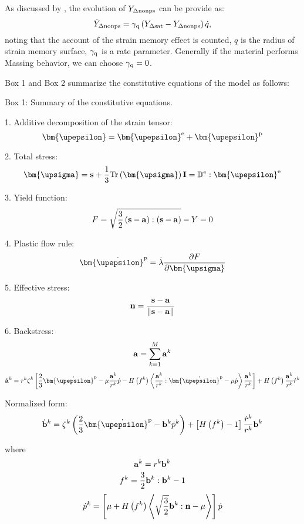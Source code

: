 As discussed by \cite{fang2015cyclic}, the evolution of ${Y_{\Delta \rm nonps}}$ can be provide as:
\begin{equation}
{\dot Y_{\Delta \rm nonps}} = {\gamma _{\rm q}}\left( {{Y_{\Delta \rm sat}} - {Y_{\Delta \rm nonps}}} \right)\dot q,
\end{equation}
noting that the account of the strain memory effect is counted, $q$ is the radius of strain memory surface, ${\gamma _{\rm q}}$ is a rate parameter.
Generally if the material performs Massing behavior, we can choose ${\gamma _{\rm q}}=0$.

Box 1 and Box 2 summarize the constitutive equations of the model as follows:

\begin{framed}
\label{Box:1}
Box 1: Summary of the constitutive equations.

1. Additive decomposition of the strain tensor:
\[{\bm{\upepsilon }} = {{\bm{\upepsilon }}^{\rm{e}}} + {{\bm{\upepsilon }}^{\rm{p}}}\]

2. Total stress:
\[{\bm{\upsigma }} = {\bf{s}} + \frac{1}{3}{\rm{Tr}}\left( {\bm{\upsigma }} \right){\bf{I}} = {\mathbb{D}^{\rm{e}}}:{{\bm{\upepsilon }}^{\rm{e}}}\]

3. Yield function:
\[F = \sqrt {\frac{3}{2}\left( {{\bf{s}} - {\bf{a}}} \right):\left( {{\bf{s}} - {\bf{a}}} \right)}  - Y = 0\]

4. Plastic flow rule:
\[{{\bm{\dot \upepsilon }}^{\rm{p}}} = \dot \lambda \frac{{\partial F}}{{\partial {\bm{\upsigma }}}}\]

5. Effective stress:
\[{\bf{n}} = \frac{{{\bf{s}} - {\bf{a}}}}{{\left\| {{\bf{s}} - {\bf{a}}} \right\|}}\]

6. Backstress:
\[{\bf{a}} = \sum\limits_{k = 1}^M {{{\bf{a}}^k}} \]
\[{{\dot{\bf a}}^k} = {r^k}{\zeta ^k}\left[ {\frac{2}{3}{{{\bm{\dot \upepsilon }}}^{\rm{p}}} - \mu \frac{{{{\bf{a}}^k}}}{{{r^k}}}\dot p - H\left( {{f^k}} \right)\left\langle {\frac{{{{\bf{a}}^k}}}{{{r^k}}}:{{{\bm{\dot \upepsilon }}}^{\rm{p}}} - \mu \dot p} \right\rangle \frac{{{{\bf{a}}^k}}}{{{r^k}}}} \right] + H\left( {{f^k}} \right)\frac{{{{\bf{a}}^k}}}{{{r^k}}}{\dot r^k}\]

Normalized form:
\[{{\dot{\bf b}}^k} = {\zeta ^k}\left( {\frac{2}{3}{{{\bm{\dot \upepsilon }}}^{\rm{p}}} - {{\bf{b}}^k}{{\dot p}^k}} \right) + \left[ {H\left( {{f^k}} \right) - 1} \right]\frac{{{{\dot r}^k}}}{{{r^k}}}{{\bf{b}}^k}\]

where
\[{{\bf{a}}^k} = {r^k}{{\bf{b}}^k}\]
\[{f^k} = \frac{3}{2}{{\bf{b}}^k}:{{\bf{b}}^k} - 1\]
\[{\dot p^k} = \left[ {\mu  + H\left( {{f^k}} \right)\left\langle {\sqrt {\frac{3}{2}} {{\bf{b}}^k}:{\bf{n}} - \mu } \right\rangle } \right]\dot p\]
\end{framed}


